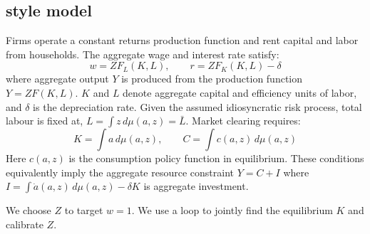 \documentclass[11pt,english]{article}
\begin{document}
\subsection{\cite{AiyagariUninsured1994} style model}

Firms operate a constant returns production function and rent capital and labor from households. The aggregate wage and interest rate satisfy:
\begin{equation}
\label{eq:prices}
w = Z F_L(K, L), \qquad r = Z F_K(K, L) - \delta
\end{equation}
where aggregate output $Y$ is produced from the production function \( Y = Z F(K, L) \). \( K \) and \( L \) denote aggregate capital and efficiency units of labor, and \( \delta \) is the depreciation rate. Given the assumed idiosyncratic risk process, total labour is fixed at, \( L = \int z \, d\mu(a,z) = \bar L\). Market clearing requires:
\begin{equation}
K = \int a \, d\mu(a,z), \qquad C = \int c(a,z) \, d\mu(a,z)
\end{equation}
Here $c(a,z)$ is the consumption policy function in equilibrium. These conditions equivalently imply the aggregate resource constraint $Y = C + I$ where $I = \int \dot a(a,z) \, d\mu(a,z) - \delta K$ is aggregate investment. 

We choose $Z$ to target $w=1$. We use a loop to jointly find the equilibrium $K$ and calibrate $Z$. 




%




 
%
%
%
%
%
%
%
%
%
%
\end{document}

